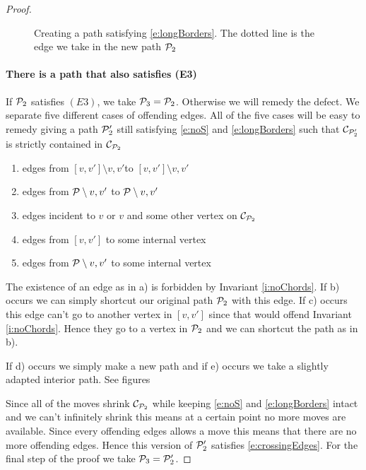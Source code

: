 \begin{proof}
\begin{figure}
    \caption{Creating a path satisfying \ref{e:longBorders}. The dotted line is the edge we take in the new path $\P_2$}\label{fig:E2}
\end{figure}

\newcommand{\intvv}{\ensuremath{[v,v']\setminus{v,v'}}}
\newcommand{\intP}{\ensuremath{\P\setminus{v,v'}}}

\paragraph{There is a path that also satisfies (E3)}
If $\P_2$ satisfies $(E3)$, we take $\P_3 = \P_2$. Otherwise we will remedy the defect. We separate five different cases of offending edges. All of the five cases will be easy to remedy giving a path $\P'_2$ still satisfying \ref{e:noS} and \ref{e:longBorders} such that $\C_{\P'_2}$ is strictly contained in $\C_{\P_2}$ %
\begin{enumerate}
 \renewcommand*{\labelenumi}{\alph{enumi})}%
 \renewcommand*{\theenumi}{\alph{enumi})}%
 \item edges from \intvv to $\intvv$
 \item edges from $\intP$ to $\intP$
 \item edges incident to $v$ or $v$ and some other vertex on $\C_{\P_2}$
 \item edges from $[v,v']$ to some internal vertex
 \item edges from $\intP$ to some internal vertex
\end{enumerate}

The existence of an edge as in a) is forbidden by Invariant \ref{i:noChords}. If b) occurs we can simply shortcut our original path $\P_2$ with this edge. If c) occurs this edge can't go to another vertex in $[v,v']$ since that would offend Invariant \ref{i:noChords}. Hence they go to a vertex in $\P_2$ and we can shortcut the path as in b).

If d) occurs we simply make a new path and if e) occurs we take a slightly adapted interior path. See figures


Since all of the moves shrink $\C_{\P_2}$ while keeping \ref{e:noS} and \ref{e:longBorders} intact and we can't infinitely shrink this means at a certain point no more moves are available. Since every offending edges allows a move this means that there are no more offending edges. Hence this version of $\P'_2$ satisfies \ref{e:crossingEdges}. For the final step of the proof we take $\P_3 = \P'_2$.


\end{proof}
